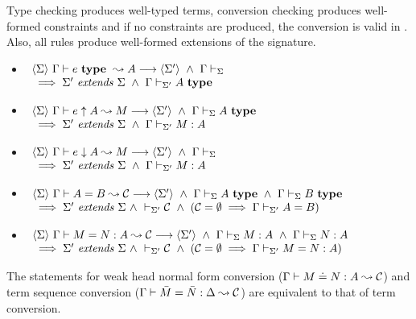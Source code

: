 \begin{theorem} \label{thmSoundNoCs}
    Type checking produces well-typed terms, conversion checking produces
    well-formed constraints and if no constraints are produced, the conversion
    is valid in {\Core}. Also, all rules produce well-formed extensions of the
    signature.
    \begin{itemize}

	\item
	    $\begin{array}[t]{l}
		\langle {\Sigma} \rangle ~{{\Gamma} \vdash {e} ~ \mathbf{type} ~ \leadsto {A}} \longrightarrow \langle {\Sigma'} \rangle
		~ \wedge ~ {\Gamma} \vdash_{\Sigma} \\
		{} \implies {\Sigma'} ~ \mathit{extends} ~ {\Sigma}
		~ \wedge ~ {\Gamma} \vdash_{\Sigma'}A ~ \mathbf{type}
	    \end{array}$

	\item
	    $\begin{array}[t]{l}
		\langle {\Sigma} \rangle ~{{\Gamma} \vdash {e} \uparrow {A} \leadsto {M}} \longrightarrow \langle {\Sigma'} \rangle
		~ \wedge ~ {\Gamma} \vdash_{\Sigma}A ~ \mathbf{type} \\
		{} \implies {\Sigma'} ~ \mathit{extends} ~ {\Sigma}
		~ \wedge ~ {\Gamma} \vdash_{\Sigma'}M:A
	    \end{array}$

	\item
	    $\begin{array}[t]{l}
		\langle {\Sigma} \rangle ~{{\Gamma} \vdash {e} \downarrow {A} \leadsto {M}} \longrightarrow \langle {\Sigma'} \rangle
		~ \wedge ~ {\Gamma} \vdash_{\Sigma} \\
		{} \implies {\Sigma'} ~ \mathit{extends} ~ {\Sigma}
		~ \wedge ~ {\Gamma} \vdash_{\Sigma'}M:A
	    \end{array}$

	\item
	    $\begin{array}[t]{l}
		\langle {\Sigma} \rangle ~{{\Gamma} \vdash {A} = {B} \leadsto {\mathcal{C}}} \longrightarrow \langle {\Sigma'} \rangle
		~ \wedge ~ {\Gamma} \vdash_{\Sigma}A ~ \mathbf{type}
		~ \wedge ~ {\Gamma} \vdash_{\Sigma}B ~ \mathbf{type}
		\\
		{} \implies {\Sigma'} ~ \mathit{extends} ~ {\Sigma}
		~ \wedge ~ \vdash_{\Sigma'} {\mathcal{C}}
		~ \wedge ~ (\mathcal{C} = \emptyset \implies {\Gamma} \vdash_{\Sigma'}A=B)
	    \end{array}$

	\item
	    $\begin{array}[t]{l}
		\langle {\Sigma} \rangle ~{{\Gamma} \vdash {M} = {N} : {A} \leadsto {\mathcal{C}}} \longrightarrow \langle {\Sigma'} \rangle
		~ \wedge ~ {\Gamma} \vdash_{\Sigma}M:A
		~ \wedge ~ {\Gamma} \vdash_{\Sigma}N:A
		\\
		{} \implies {\Sigma'} ~ \mathit{extends} ~ {\Sigma}
		~ \wedge ~ \vdash_{\Sigma'} {\mathcal{C}}
		~ \wedge ~ (\mathcal{C} = \emptyset \implies {\Gamma} \vdash_{\Sigma'}M=N:A)
	    \end{array}$

    \end{itemize}

    The statements for weak head normal form conversion (${\Gamma} \vdash {M} \doteq {N} : {A} \leadsto {\mathcal{C}}$) and term sequence conversion (${\Gamma} \vdash {\bar M} = {\bar N} : {\Delta} \leadsto {\mathcal{C}}$)
    are equivalent to that of term conversion.
\end{theorem}

